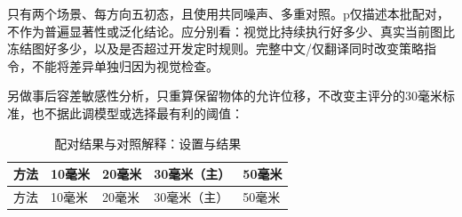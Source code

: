 只有两个场景、每方向五初态，且使用共同噪声、多重对照。p仅描述本批配对，不作为普遍显著性或泛化结论。应分别看：视觉比持续执行好多少、真实当前图比冻结图好多少，以及是否超过开发定时规则。完整中文/仅翻译同时改变策略指令，不能将差异单独归因为视觉检查。

另做事后容差敏感性分析，只重算保留物体的允许位移，不改变主评分的30毫米标准，也不据此调模型或选择最有利的阈值：

\FloatBarrier\begingroup\small\setlength{\tabcolsep}{2.5pt}
\begin{longtable}[]{@{}
  >{\raggedright\arraybackslash}p{}
  >{\raggedright\arraybackslash}p{}
  >{\raggedright\arraybackslash}p{}
  >{\raggedright\arraybackslash}p{}
  >{\raggedright\arraybackslash}p{}@{}}
\caption{配对结果与对照解释：设置与结果}\label{tab:s13-6}\tabularnewline
\toprule\noalign{}
\begin{minipage}[b]{\linewidth}\raggedright
方法
\end{minipage} & \begin{minipage}[b]{\linewidth}\raggedright
10毫米
\end{minipage} & \begin{minipage}[b]{\linewidth}\raggedright
20毫米
\end{minipage} & \begin{minipage}[b]{\linewidth}\raggedright
30毫米（主）
\end{minipage} & \begin{minipage}[b]{\linewidth}\raggedright
50毫米
\end{minipage} \\
\midrule\noalign{}
\endfirsthead
\toprule\noalign{}
\begin{minipage}[b]{\linewidth}\raggedright
方法
\end{minipage} & \begin{minipage}[b]{\linewidth}\raggedright
10毫米
\end{minipage} & \begin{minipage}[b]{\linewidth}\raggedright
20毫米
\end{minipage} & \begin{minipage}[b]{\linewidth}\raggedright
30毫米（主）
\end{minipage} & \begin{minipage}[b]{\linewidth}\raggedright
50毫米
\end{minipage} \\

\end{longtable}
